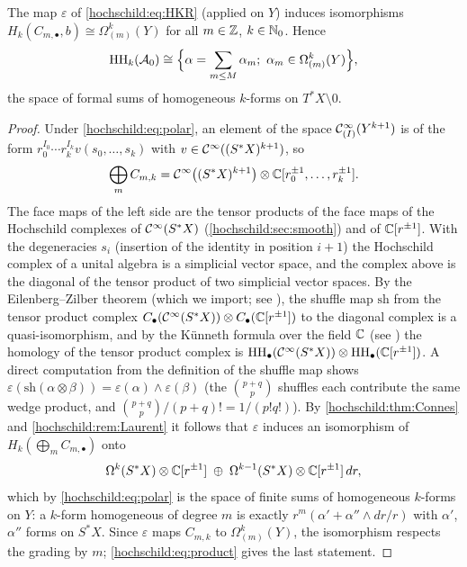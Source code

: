 \begin{theorem}\label{hochschild:thm:commutative}
The map $\varepsilon$ of \eqref{hochschild:eq:HKR} (applied on $Y$) induces
isomorphisms $H_k(C_{m,\bullet},b)\cong\Omega^k_{(m)}(Y)$ for all $m\in\mathbb{Z}$,
$k\in\mathbb{N}_0$. Hence
\begin{equation*}
  \operatorname{HH}_k(\mathcal{A}_0)\cong\Bigl\{\alpha=\sum_{m\le M}\alpha_m;\ \alpha_m\in\Omega^k_{(m)}(Y)\Bigr\},
\end{equation*}
the space of formal sums of homogeneous $k$-forms on $T^*X\setminus0$.
\end{theorem}
\begin{proof}
Under \eqref{hochschild:eq:polar}, an element of the space $\mathcal{C}^\infty_{(I)}(Y^{k+1})$ is
of the form $r_0^{I_0}\cdots r_k^{I_k}v(s_0,\dots,s_k)$ with $v\in\mathcal{C}^\infty((S^*X)^{k+1})$, so
\begin{equation*}
  \bigoplus_mC_{m,k}=\mathcal{C}^\infty\bigl((S^*X)^{k+1}\bigr)\otimes\mathbb{C}[r_0^{\pm1},\dots,r_k^{\pm1}].
\end{equation*}
The face maps of the left side are the tensor products of the face maps of
the Hochschild complexes of $\mathcal{C}^\infty(S^*X)$ (\cref{hochschild:sec:smooth}) and of
$\mathbb{C}[r^{\pm1}]$. With the degeneracies $s_i$ (insertion of the identity in
position $i+1$) the Hochschild complex of a unital algebra is a simplicial
vector space, and the complex above is the diagonal of the tensor product of
two simplicial vector spaces. By the Eilenberg--Zilber theorem (which we
import; see \cite[Section~8.5]{Weibel}), the shuffle
map $\mathrm{sh}$ from the tensor product complex
$C_\bullet(\mathcal{C}^\infty(S^*X))\otimes C_\bullet(\mathbb{C}[r^{\pm1}])$ to the diagonal complex
is a quasi-isomorphism, and by the K\"unneth formula over the field $\mathbb{C}$
(see \cite[Section~3.6]{Weibel}) the homology of
the tensor product complex is $\operatorname{HH}_\bullet(\mathcal{C}^\infty(S^*X))\otimes\operatorname{HH}_\bullet(\mathbb{C}[r^{\pm1}])$.
A direct computation from the definition of the shuffle map shows
$\varepsilon(\mathrm{sh}(\alpha\otimes\beta))=\varepsilon(\alpha)\wedge\varepsilon(\beta)$
(the $\binom{p+q}{p}$ shuffles each contribute the same wedge product, and
$\binom{p+q}p/(p+q)!=1/(p!q!)$). By \cref{hochschild:thm:Connes} and
\cref{hochschild:rem:Laurent} it follows that $\varepsilon$ induces an
isomorphism of $H_k(\bigoplus_mC_{m,\bullet})$ onto
\begin{equation*}
  \Omega^k(S^*X)\otimes\mathbb{C}[r^{\pm1}]\;\oplus\;\Omega^{k-1}(S^*X)\otimes\mathbb{C}[r^{\pm1}]\,dr ,
\end{equation*}
which by \eqref{hochschild:eq:polar} is the space of finite sums of
homogeneous $k$-forms on $Y$: a $k$-form homogeneous of degree $m$ is exactly
$r^m(\alpha'+\alpha''\wedge dr/r)$ with $\alpha'$, $\alpha''$ forms on $S^*X$.
Since $\varepsilon$ maps $C_{m,k}$ to $\Omega^k_{(m)}(Y)$, the isomorphism
respects the grading by $m$; \eqref{hochschild:eq:product} gives the last
statement.
\end{proof}

